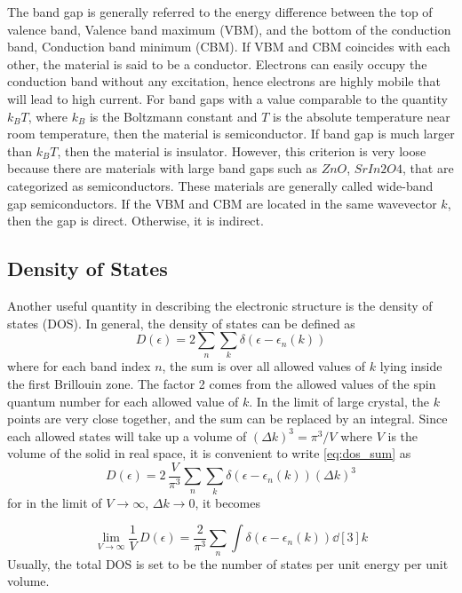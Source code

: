 The band gap is generally referred to the energy difference between the top of valence band, Valence band maximum (VBM),  and the bottom of the conduction band, Conduction band minimum (CBM). If VBM and CBM coincides with each other, the material is said to be a conductor. Electrons can easily occupy the conduction band without any excitation, hence electrons are highly mobile that will lead to high current. For band gaps with a value comparable to the quantity $k_B T$, where $k_B$ is the Boltzmann constant and  $T$ is the absolute temperature near room temperature, then the material is semiconductor. If band gap is much larger than $k_B T$, then the material is insulator. However, this criterion is very loose because there are materials with large band gaps such as $ZnO$, $SrIn2O4$, that are categorized as semiconductors. These materials are generally called wide-band gap semiconductors. If the VBM and CBM are located in the same wavevector $k$, then the gap is direct. Otherwise, it is indirect.

\subsection{Density of States}
Another useful quantity in describing the electronic structure is the density of states (DOS). In general, the density of states can be defined as \citep{Ashcroft1976}
\begin{equation} \label{eq:dos_sum}
	D(\epsilon) = 2 \sum_n \sum_k \delta(\epsilon - \epsilon_n(k))
\end{equation}
where for each band index $n$, the sum is over all allowed values of $k$ lying inside the first Brillouin zone. The factor 2 comes from the allowed values of the spin quantum number for each allowed value of $k$. In the limit of large crystal, the $k$ points are very close together, and the sum can be replaced by an integral. Since each allowed states will take up a volume of $ (\Delta k)^3 = \pi^3/V$ where $V$ is the volume of the solid in real space, it is convenient to write \eqref{eq:dos_sum} as
\begin{equation} \label{eq:dos_int}
	D(\epsilon) = 2\, \frac{V}{\pi^3} \sum_n \sum_k \delta(\epsilon - \epsilon_n(k)) (\Delta k)^3
\end{equation}
for  in the limit of $V \rightarrow \infty $, $\Delta k \rightarrow 0$, it becomes

\begin{equation}
	\lim_{V \to \infty} \frac{1}{V}\, D(\epsilon) = \frac{2}{\pi^3} \sum_n \int \delta(\epsilon - \epsilon_n(k)) \dd[3]{k}
\end{equation}
Usually, the total DOS is set to be the number of states per unit energy per unit volume.

